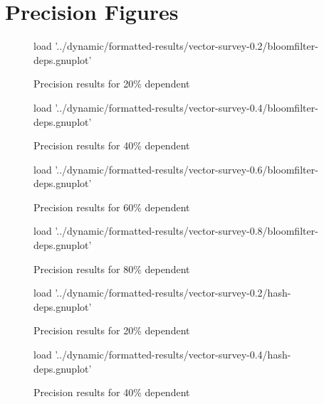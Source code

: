 \chapter{Precision Figures} \label{chp:appndx:precision-figs}
\begin{figure}[H]
	\centering
	\begin{gnuplot}[terminal=pdf]
	load '../dynamic/formatted-results/vector-survey-0.2/bloomfilter-deps.gnuplot'
	\end{gnuplot}
	\caption{Precision results for 20\% dependent}
	\label{chart:precision-0.2-bloom}
\end{figure}


\begin{figure}[H]
	\centering
	\begin{gnuplot}[terminal=pdf]
	load '../dynamic/formatted-results/vector-survey-0.4/bloomfilter-deps.gnuplot'
	\end{gnuplot}
	\caption{Precision results for 40\% dependent}
	\label{chart:precision-0.4-bloom}
\end{figure}

\begin{figure}[H]
	\centering
	\begin{gnuplot}[terminal=pdf]
	load '../dynamic/formatted-results/vector-survey-0.6/bloomfilter-deps.gnuplot'
	\end{gnuplot}
	\caption{Precision results for 60\% dependent}
	\label{chart:precision-0.6-bloom}
\end{figure}

\begin{figure}[H]
	\centering
	\begin{gnuplot}[terminal=pdf]
	load '../dynamic/formatted-results/vector-survey-0.8/bloomfilter-deps.gnuplot'
	\end{gnuplot}
	\caption{Precision results for 80\% dependent}
	\label{chart:precision-0.8-bloom}
\end{figure}

\begin{figure}[H]
	\centering
	\begin{gnuplot}[terminal=pdf]
	load '../dynamic/formatted-results/vector-survey-0.2/hash-deps.gnuplot'
	\end{gnuplot}
	\caption{Precision results for 20\% dependent}
	\label{chart:precision-0.2-hash}
\end{figure}


\begin{figure}[H]
	\centering
	\begin{gnuplot}[terminal=pdf]
	load '../dynamic/formatted-results/vector-survey-0.4/hash-deps.gnuplot'
	\end{gnuplot}
	\caption{Precision results for 40\% dependent}
	\label{chart:precision-0.4-hash}
\end{figure}

